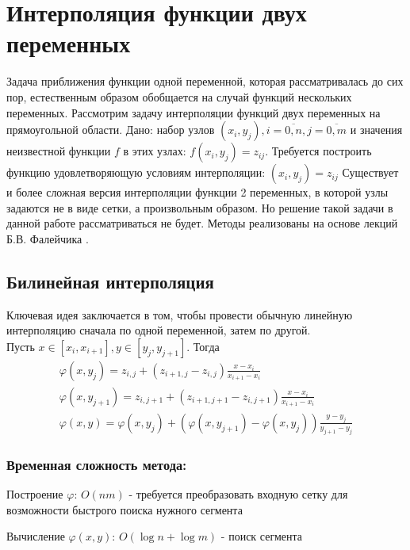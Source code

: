 \section{Интерполяция функции двух переменных}

Задача приближения функции одной переменной, которая рассматривалась до сих пор, естественным образом обобщается на случай функций нескольких переменных. Рассмотрим задачу интерполяции функций двух переменных на прямоугольной области. Дано: набор узлов $(x_i,y_j), i=\overline{0,n}, j=\overline{0,m}$ и значения неизвестной функции $f$ в этих узлах: $f(x_i,y_j)=z_{ij}$. Требуется построить функцию удовлетворяющую условиям интерполяции: $(x_i,y_j) = z_{ij}$
Существует и более сложная версия интерполяции функции 2 переменных, в которой узлы задаются не в виде сетки, а  произвольным образом. Но решение такой задачи в данной работе рассматриваться не будет. Методы реализованы на основе лекций Б.В. Фалейчика \cite{faleichik2010} \cite{faleichik2012}.

\subsection{Билинейная интерполяция}

Ключевая идея заключается в том, чтобы провести обычную линейную интерполяцию сначала по одной переменной, затем по другой. \\
\noindent Пусть $x \in [x_i,x_{i+1}], y \in [y_j,y_{j+1}]$. Тогда
\begin{equation}
  \begin{gathered}
    \varphi(x, y_j) = z_{i,j} + (z_{i+1,j} - z_{i,j}) \frac{x-x_i}{x_{i+1} - x_i} \\
    \varphi(x, y_{j+1}) = z_{i,j+1} + (z_{i+1,j+1} - z_{i,j+1}) \frac{x-x_i}{x_{i+1} - x_i} \\
    \varphi(x,y) = \varphi(x,y_j) + (\varphi(x, y_{j+1}) - \varphi(x, y_j)) \frac{y-y_j}{y_{j+1} - y_j}
  \end{gathered}
\end{equation}

\subsubsection{Временная сложность метода:}

Построение $\varphi$: $O(n m)$ - требуется преобразовать входную сетку для возможности быстрого поиска нужного сегмента

Вычисление $\varphi(x, y)$: $O(\log n + \log m)$ - поиск сегмента

